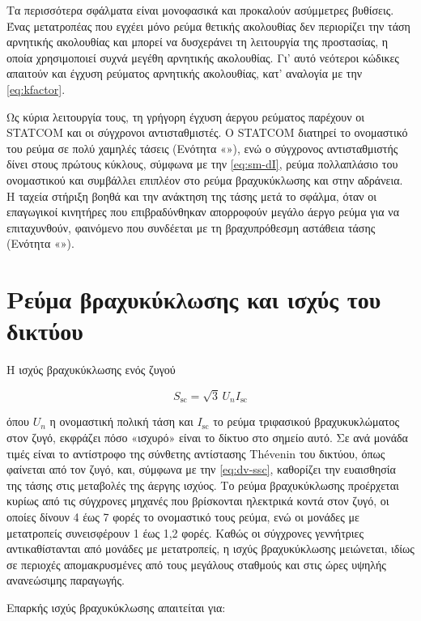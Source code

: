 Τα περισσότερα σφάλματα είναι μονοφασικά και προκαλούν ασύμμετρες βυθίσεις. Ένας μετατροπέας
που εγχέει μόνο ρεύμα θετικής ακολουθίας δεν περιορίζει την τάση αρνητικής ακολουθίας και
μπορεί να δυσχεράνει τη λειτουργία της προστασίας, η οποία χρησιμοποιεί συχνά μεγέθη αρνητικής
ακολουθίας. Γι' αυτό νεότεροι κώδικες απαιτούν και έγχυση ρεύματος αρνητικής ακολουθίας, κατ'
αναλογία με την \eqref{eq:kfactor}.

Ως κύρια λειτουργία τους, τη γρήγορη έγχυση άεργου ρεύματος παρέχουν οι STATCOM και οι
σύγχρονοι αντισταθμιστές. Ο STATCOM διατηρεί το ονομαστικό του ρεύμα σε πολύ χαμηλές τάσεις
(Ενότητα «»), ενώ ο σύγχρονος αντισταθμιστής δίνει στους πρώτους κύκλους,
σύμφωνα με την \eqref{eq:sm-dI}, ρεύμα πολλαπλάσιο του ονομαστικού και συμβάλλει επιπλέον στο
ρεύμα βραχυκύκλωσης και στην αδράνεια. Η ταχεία στήριξη βοηθά και την ανάκτηση της τάσης μετά
το σφάλμα, όταν οι επαγωγικοί κινητήρες που επιβραδύνθηκαν απορροφούν μεγάλο άεργο ρεύμα για να
επιταχυνθούν, φαινόμενο που συνδέεται με τη βραχυπρόθεσμη αστάθεια τάσης (Ενότητα
«»).

\section{Ρεύμα βραχυκύκλωσης και ισχύς του δικτύου}
\label{sec:ssc}

Η ισχύς βραχυκύκλωσης ενός ζυγού

\begin{equation}
S_{\mathrm{sc}} = \sqrt{3}\, U_n I_{\mathrm{sc}}
\label{eq:ssc}
\end{equation}

όπου $U_n$ η ονομαστική πολική τάση και $I_{\mathrm{sc}}$ το ρεύμα τριφασικού βραχυκυκλώματος
στον ζυγό, εκφράζει πόσο «ισχυρό» είναι το δίκτυο στο σημείο αυτό. Σε ανά μονάδα τιμές είναι
το αντίστροφο της σύνθετης αντίστασης Thévenin του δικτύου, όπως φαίνεται από τον ζυγό, και,
σύμφωνα με την \eqref{eq:dv-ssc}, καθορίζει την ευαισθησία της τάσης στις μεταβολές της άεργης
ισχύος. Το ρεύμα βραχυκύκλωσης προέρχεται κυρίως από τις σύγχρονες μηχανές που βρίσκονται
ηλεκτρικά κοντά στον ζυγό, οι οποίες δίνουν 4 έως 7 φορές το ονομαστικό τους ρεύμα, ενώ οι
μονάδες με μετατροπείς συνεισφέρουν 1 έως 1,2 φορές. Καθώς οι σύγχρονες γεννήτριες
αντικαθίστανται από μονάδες με μετατροπείς, η ισχύς βραχυκύκλωσης μειώνεται, ιδίως σε περιοχές
απομακρυσμένες από τους μεγάλους σταθμούς και στις ώρες υψηλής ανανεώσιμης παραγωγής.

Επαρκής ισχύς βραχυκύκλωσης απαιτείται για:

